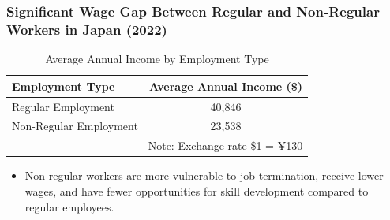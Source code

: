 \documentclass[serif, aspectratio=169]{beamer}
\newcommand{\gendergaplinks}{%
    \vfill %
    \hfill %
    {\small %
        \hyperlink{gendergapindex}{\beamerbutton{Reference}} \,

    }
}
\begin{document}

\begin{frame}[label=gender_income_gap]
\frametitle{Significant Wage Gap Between Regular and Non-Regular Workers in Japan (2022)}
\begin{table}[ht]
\centering
\begin{tabular}{lc}
\toprule
Employment Type & Average Annual Income (\$) \\
\midrule
Regular Employment & 40,846 \\
Non-Regular Employment & 23,538 \\
\bottomrule
\multicolumn{2}{r}{\footnotesize Note: Exchange rate \$1 = ¥130} \\
\end{tabular}
\caption{Average Annual Income by Employment Type}
\label{tab:average_income}
\end{table}
\begin{itemize}
\item Non-regular workers are more vulnerable to job termination, receive lower wages, and have fewer opportunities for skill development compared to regular employees.
\end{itemize}
\gendergaplinks
\end{frame}

\end{document}
